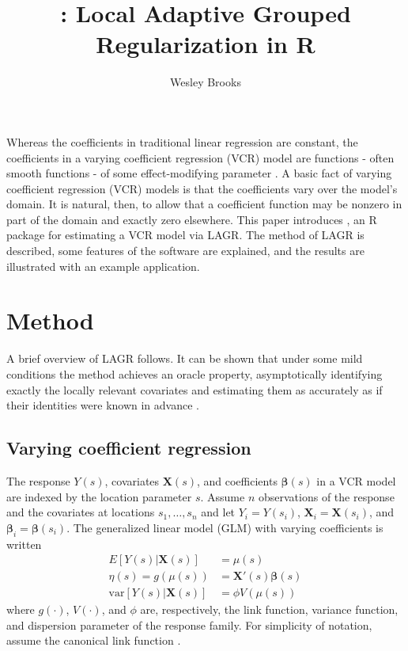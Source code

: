 \title{: Local Adaptive Grouped Regularization in R}
\author{Wesley Brooks}

\maketitle

Whereas the coefficients in traditional linear regression are constant, the coefficients in a varying coefficient regression (VCR) model are functions - often smooth functions - of some effect-modifying parameter \citep{Cleveland-Grosse-1991,Hastie-Tibshirani-1993}. A basic fact of varying coefficient regression (VCR) models is that the coefficients vary over the model's domain. It is natural, then, to allow that a coefficient function may be nonzero in part of the domain and exactly zero elsewhere. This paper introduces , an R package for estimating a VCR model via LAGR. The method of LAGR is described, some features of the software are explained, and the results are illustrated with an example application.

\section{Method}
A brief overview of LAGR follows. It can be shown that under some mild conditions the method achieves an oracle property, asymptotically identifying exactly the locally relevant covariates and estimating them as accurately as if their identities were known in advance \citep{Brooks-Zhu-Lu-2014}.

\subsection{Varying coefficient regression}
The response $Y(s)$, covariates $\bm{X}(s)$, and coefficients $\bm{\beta}(s)$ in a VCR model are indexed by the location parameter $s$. Assume $n$ observations of the response and the covariates at locations $s_1, \dots, s_n$ and let $Y_i = Y(s_i)$, $\bm{X}_i = \bm{X}(s_i)$, and $\bm{\beta}_i = \bm{\beta}(s_i)$. The generalized linear model (GLM) with varying coefficients is written
\begin{align*}
	E[Y(s)|\bm{X}(s)] &= \mu(s)\\
	\eta(s) = g(\mu(s)) &= \bm{X}'(s) \bm{\beta}(s)\\
	\text{var}[Y(s)|\bm{X}(s)] &= \phi V(\mu(s))
\end{align*}
where $g(\cdot)$, $V(\cdot)$, and $\phi$ are, respectively, the link function, variance function, and dispersion parameter of the response family. For simplicity of notation, assume the canonical link function \citep{McCullagh-Nelder-1989}.

